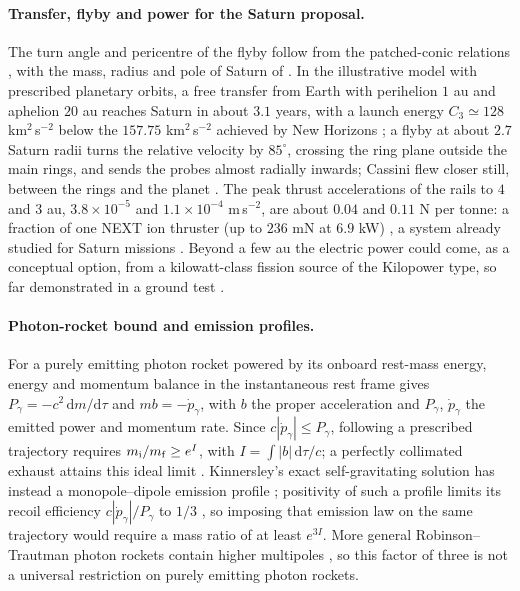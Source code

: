\documentclass[12pt]{iopart}
\theoremstyle{plain}
\theoremstyle{definition}
\theoremstyle{remark}
\newcommand{\dd}{\mathrm{d}}
\begin{document}
\paragraph{Transfer, flyby and power for the Saturn proposal.}
The turn angle and pericentre of the flyby follow from the patched-conic relations
\cite[\S\S9.1--9.2]{Battin1999}, with the mass, radius and pole of Saturn of
\cite{Jacobson2006,Archinal2018}. In the
illustrative model with prescribed planetary orbits, a free transfer from
Earth with perihelion $1$ au and aphelion $20$ au reaches Saturn in about
$3.1$ years, with a launch energy $C_3\simeq128$ km$^2$\,s$^{-2}$ below the
$157.75$ km$^2$\,s$^{-2}$ achieved by New Horizons \cite{GuoFarquhar2008}; a flyby at about $2.7$ Saturn radii turns the relative velocity
by $85^\circ$, crossing the ring plane outside the main rings, and sends the
probes almost radially inwards; Cassini flew closer still, between the rings
and the planet \cite{Spilker2019}. The peak thrust accelerations of the rails to $4$
and $3$ au, $3.8\times10^{-5}$ and $1.1\times10^{-4}$ m\,s$^{-2}$, are about $0.04$ and
$0.11$ N per tonne: a fraction of one NEXT ion thruster (up to $236$ mN at $6.9$ kW)
\cite{PattersonBenson2007}, a system already studied for Saturn missions
\cite{BensonRiehlOleson2007}. Beyond a few au the electric power could come, as a
conceptual option, from a kilowatt-class fission source of the Kilopower type, so
far demonstrated in a ground test \cite{Gibson2018}.

\paragraph{Photon-rocket bound and emission profiles.}
For a purely emitting photon rocket powered by its onboard rest-mass energy, energy
and momentum balance in the instantaneous rest frame gives $P_\gamma=-c^2\,\dd m/\dd\tau$ and
$mb=-\dot p_\gamma$, with $b$ the proper acceleration and $P_\gamma$, $\dot p_\gamma$ the
emitted power and momentum rate. Since $c|\dot p_\gamma|\le P_\gamma$, following a
prescribed trajectory requires $m_{\rm i}/m_{\rm f}\ge e^{I}$, with $I=\int|b|\,\dd\tau/c$;
a perfectly collimated exhaust attains this ideal limit \cite{Fuzfa2019}.
Kinnersley's exact self-gravitating solution has instead a monopole--dipole emission profile
\cite{Kinnersley1969,Bonnor1994}; positivity of such a profile limits its recoil efficiency
$c|\dot p_\gamma|/P_\gamma$ to $1/3$ \cite{Bonnor1994}, so imposing that emission law on the
same trajectory would require a mass ratio of at least $e^{3I}$. More general
Robinson--Trautman photon rockets contain higher multipoles \cite{Bonnor1996}, so this factor
of three is not a universal restriction on purely emitting photon rockets.
\end{document}
